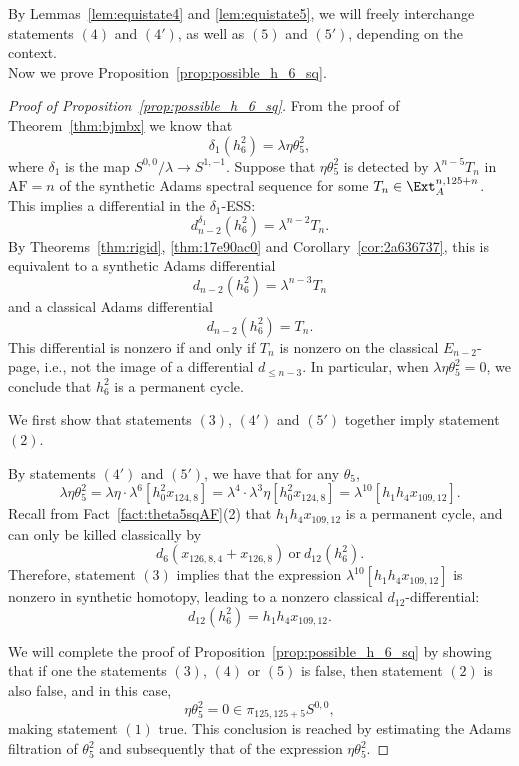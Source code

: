 \documentclass{amsart}
\numberwithin{equation}{section}
\newcommand{\AF}{\mathrm{AF}}
\begin{document}
By Lemmas~\ref{lem:equistate4} and \ref{lem:equistate5}, we will freely interchange statements $(4)$ and $(4')$, as well as $(5)$ and $(5')$, depending on the context.\\

Now we prove Proposition~\ref{prop:possible_h_6_sq}.

\begin{proof}[Proof of Proposition~\ref{prop:possible_h_6_sq}]
    From the proof of Theorem~\ref{thm:bjmbx} \cite{BurklundXu} we know that
    $$\delta_1(h_6^2) = \lambda \eta \theta_5^2,$$
    where $\delta_1$ is the map $S^{0,0}/\lambda \rightarrow S^{1,-1}$. Suppose that $\eta \theta_5^2$ is detected by $\lambda^{n-5} T_n$ in $\AF = n$ of the synthetic Adams spectral sequence for some $T_n \in \Ext_A^{n, 125+n}$. This implies a differential in the $\delta_1$-ESS:
    $$d_{n-2}^{\delta_1} (h_6^2) = \lambda^{n-2} T_n.$$
    By Theorems~\ref{thm:rigid}, \ref{thm:17e90ac0} and Corollary~\ref{cor:2a636737}, this is equivalent to a 
    synthetic Adams differential
    $$d_{n-2} (h_6^2) = \lambda^{n-3} T_n$$
    and a classical Adams differential
    $$d_{n-2} (h_6^2) = T_n.$$
    This differential is nonzero if and only if $T_n$ is nonzero on the classical $E_{n-2}$-page, i.e., not the image of a differential $d_{\le n-3}$. In particular, when $\lambda \eta \theta_5^2=0$, we conclude that $h_6^2$ is a permanent cycle.

    We first show that statements $(3)$, $(4')$ and $(5')$ together imply statement $(2)$.

    By statements $(4')$ and $(5')$, we have that for any $\theta_5$,
    $$\lambda \eta \theta_5^2 = \lambda \eta \cdot \lambda^6 [h_0^2x_{124,8}] = \lambda^4 \cdot \lambda^3 \eta [h_0^2x_{124,8}] = \lambda^{10} [h_1h_4x_{109,12}].$$
Recall from Fact~\ref{fact:theta5sqAF}(2) that $h_1h_4x_{109,12}$ is a permanent cycle, and can only be killed classically by 
    $$d_6(x_{126,8,4} + x_{126,8}) \ \text{or} \ d_{12}(h_6^2).$$
    Therefore, statement $(3)$ implies that the expression $\lambda^{10} [h_1h_4x_{109,12}]$ is nonzero in synthetic homotopy, leading to a nonzero classical $d_{12}$-differential:
    $$d_{12}(h_6^2) = h_1h_4x_{109,12}.$$
    
We will complete the proof of
    Proposition~\ref{prop:possible_h_6_sq} by showing that if one the statements $(3)$, $(4)$ or $(5)$ is false, then statement $(2)$ is also false, and in this case, 
    $$\eta \theta_5^2 = 0 \in \pi_{125,125+5} S^{0,0},$$ 
    making statement $(1)$ true. This conclusion is reached by estimating the Adams filtration of $\theta_5^2$ and subsequently that of the expression $\eta \theta_5^2$. 




\end{proof}
\end{document}
